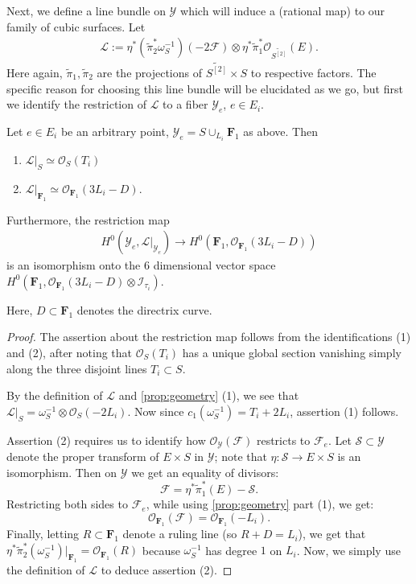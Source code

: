 \documentclass[12pt,reqno]{amsart}
\renewcommand{\to}{{\longrightarrow}}
\numberwithin{equation}{section}
\renewcommand{\O}{\mathcal O}
\newcommand{\F}{\mathbf F}
\newcommand{\td}{\widetilde}
\begin{document}
Next, we define a line bundle on $\mathcal{Y}$ which will induce a
(rational map) to our family of cubic surfaces.   Let
\begin{align}
  \label{eq:linebundle}
  \mathcal{L} :=\eta^{*} \left( \td{\pi}_{2}^{*}\omega_{S}^{-1} \right)(-2\mathcal{F})\otimes \eta^{*}\td{\pi}_{1}^{*}\O_{\td{S^{[2]}}}(E).
\end{align}
Here again, $\td{\pi}_{1}, \td{\pi}_{2}$ are the projections of
$\td{S^{[2]}} \times S$ to respective factors. The specific reason for
choosing this line bundle will be elucidated as we go, but first we
identify the restriction of $\mathcal{L}$ to a fiber
$\mathcal{Y}_{e}$, $e \in E_{i}$.

\begin{proposition}
  \label{prop:LYe}
  Let $e \in E_{i}$ be an arbitrary point, $\mathcal{Y}_{e} = S \cup_{L_{i}} \F_{1}$ as above.  Then
  \begin{enumerate}
  \item $\mathcal{L}|_{S} \simeq \O_{S}(T_{i})$
  \item $\mathcal{L}|_{\F_{1}} \simeq \O_{\F_{1}}(3L_{i}-D)$.
  \end{enumerate}
  Furthermore, the restriction map
  \begin{align}
    \label{eq:restrL}
    H^{0}(\mathcal{Y}_{e}, \mathcal{L}|_{\mathcal{Y}_{e}}) \to H^{0}(\F_{1}, \O_{\F_{1}}(3L_{i}-D))
  \end{align}
  is an isomorphism onto the $6$ dimensional vector space
  $H^{0}\left(\F_{1}, \O_{\F_{1}}(3L_{i}-D) \otimes \mathcal{I}_{\tau_{i}}\right).$
\end{proposition}

Here, $D \subset \F_{1}$ denotes the directrix curve.

\begin{proof}
  The assertion about the restriction map follows from the
  identifications (1) and (2), after noting that $\O_{S}(T_{i})$ has a
  unique global section vanishing simply along the three disjoint
  lines $T_{i} \subset S$.

  By the definition of $\mathcal{L}$ and \autoref{prop:geometry} (1),
  we see that
  $\mathcal{L}|_{S} = \omega_{S}^{-1} \otimes \O_{S}(-2L_{i})$. Now
  since $c_{1}( \omega_{S}^{-1}) = T_{i} + 2L_{i}$, assertion (1) follows.

  Assertion (2) requires us to identify how
  $\O_{\mathcal{Y}}(\mathcal{F})$ restricts to $\mathcal{F}_{e}$. Let
  $\mathcal{S} \subset \mathcal{Y}$ denote the proper transform of
  $E \times S$ in $\mathcal{Y}$; note that
  $\eta: \mathcal{S} \to E \times S$ is an isomorphism.  Then on
  $\mathcal{Y}$ we get an equality of divisors:
  \[\mathcal{F} = \eta^{*}\td{\pi}_{1}^{*}(E) - \mathcal{S}.\]
  Restricting both sides to $\mathcal{F}_{e}$, while using
  \autoref{prop:geometry} part (1), we get:
  \[\O_{\F_{1}}(\mathcal{F}) = \O_{\F_{1}}(-L_{i}).\] Finally, letting
  $R \subset \F_{1}$ denote a ruling line (so $R+D = L_{i}$), we get
  that
  $\eta^{*}\td{\pi}_{2}^{*}(\omega_{S}^{-1})|_{\F_{1}} =
  \O_{\F_{1}}(R)$ because $\omega_{S}^{-1}$ has degree $1$ on $L_{i}$.
  Now, we simply use the definition of $\mathcal{L}$ to deduce
  assertion (2).
\end{proof}
\end{document}
